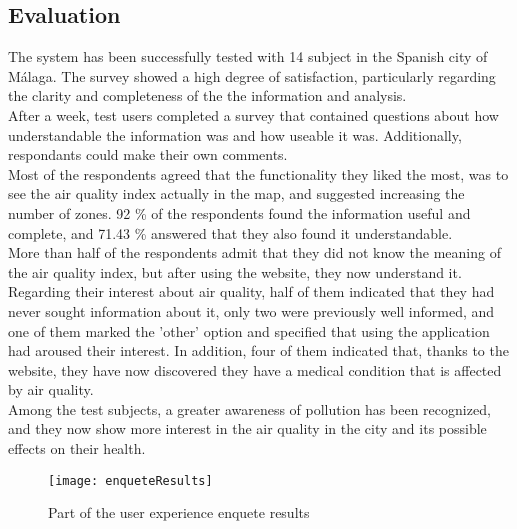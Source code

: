 \subsection*{Evaluation}

The system has been successfully tested with 14 subject in the Spanish city of Málaga. The survey showed a high degree of satisfaction, 
particularly regarding the clarity and completeness of the the information and analysis.\\

After a week, test users completed a survey that contained questions about how understandable the information was
and how useable it was. Additionally, respondants could make their own comments.\\

Most of the respondents agreed that the functionality they liked the most, was to see the air quality index actually in the
map, and suggested increasing the number of zones.
92 \% of the respondents found the information useful and complete, and 71.43 \% answered that they also found it
understandable.\\

More than half of the respondents admit that they did not know the meaning of the air quality index, but after
using the website, they now understand it.\\

Regarding their interest about air quality, half of them indicated that they had never sought information about it,
only two were previously well informed, and one of them marked the 'other' option and specified that using the application had aroused their interest.
In addition, four of them indicated that, thanks to the website, they have now discovered they have a medical condition that is affected by air quality.\\

Among the test subjects, a greater awareness of pollution has been recognized, and they now show more interest in the
air quality in the city and its possible effects on their health.

\begin{figure}[ht]
   \centering
   \texttt{[image: enqueteResults]}
   \caption{Part of the user experience enquete results}
\end{figure}